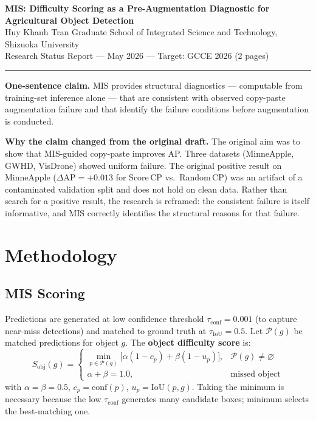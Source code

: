 \documentclass[10pt, a4paper]{article}
\begin{document}
\begin{center}
  {\large\textbf{MIS: Difficulty Scoring as a Pre-Augmentation Diagnostic
    for Agricultural Object Detection}}\\[4pt]
  Huy Khanh Tran \quad
  Graduate School of Integrated Science and Technology,
  Shizuoka University\\[2pt]
  {\small Research Status Report --- May 2026 --- Target: GCCE 2026 (2 pages)}
\end{center}
\rule{\linewidth}{1pt}
\vspace{2pt}

\textbf{One-sentence claim.}
MIS provides structural diagnostics --- computable from training-set inference
alone --- that are consistent with observed copy-paste augmentation failure
and that identify the failure conditions before augmentation is conducted.

\textbf{Why the claim changed from the original draft.}
The original aim was to show that MIS-guided copy-paste improves AP.
Three datasets (MinneApple, GWHD, VisDrone) showed uniform failure.
The original positive result on MinneApple ($\Delta\text{AP}=+0.013$
for Score\,CP vs.\ Random\,CP) was an artifact of a contaminated validation
split and does not hold on clean data.
Rather than search for a positive result, the research is reframed:
the consistent failure is itself informative, and MIS correctly identifies
the structural reasons for that failure.

\section{Methodology}

\subsection{MIS Scoring}

Predictions are generated at low confidence threshold $\tau_{\text{conf}}=0.001$
(to capture near-miss detections) and matched to ground truth at
$\tau_{\text{IoU}}=0.5$.
Let $\mathcal{P}(g)$ be matched predictions for object $g$.
The \textbf{object difficulty score} is:
\begin{equation}
  S_{\text{obj}}(g) = \begin{cases}
    \min_{p \in \mathcal{P}(g)}
      \bigl[\alpha(1 - c_p) + \beta(1 - u_p)\bigr],
      & \mathcal{P}(g) \neq \varnothing \\
    \alpha + \beta = 1.0, & \text{missed object}
  \end{cases}
  \label{eq:sobj}
\end{equation}
with $\alpha=\beta=0.5$, $c_p=\text{conf}(p)$, $u_p=\text{IoU}(p,g)$.
Taking the minimum is necessary because the low $\tau_{\text{conf}}$
generates many candidate boxes; minimum selects the best-matching one.
\end{document}
